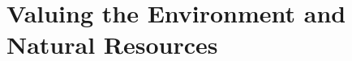 \documentclass[../main]{subfiles}
\begin{document}
\section{Valuing the Environment and Natural Resources}
\end{document}
